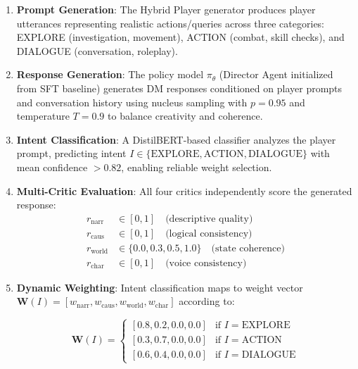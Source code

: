 \documentclass[11pt]{article}
\begin{document}
\begin{enumerate}
    \item \textbf{Prompt Generation}: The Hybrid Player generator produces player utterances representing realistic actions/queries across three categories: EXPLORE (investigation, movement), ACTION (combat, skill checks), and DIALOGUE (conversation, roleplay).
    
    \item \textbf{Response Generation}: The policy model $\pi_\theta$ (Director Agent initialized from SFT baseline) generates DM responses conditioned on player prompts and conversation history using nucleus sampling with $p=0.95$ and temperature $T=0.9$ to balance creativity and coherence.
    
    \item \textbf{Intent Classification}: A DistilBERT-based classifier analyzes the player prompt, predicting intent $I \in \{\text{EXPLORE}, \text{ACTION}, \text{DIALOGUE}\}$ with mean confidence $>0.82$, enabling reliable weight selection.
    
    \item \textbf{Multi-Critic Evaluation}: All four critics independently score the generated response:
    \begin{align}
        r_{\text{narr}} &\in [0,1] \quad \text{(descriptive quality)} \\
        r_{\text{caus}} &\in [0,1] \quad \text{(logical consistency)} \\
        r_{\text{world}} &\in \{0.0, 0.3, 0.5, 1.0\} \quad \text{(state coherence)} \\
        r_{\text{char}} &\in [0,1] \quad \text{(voice consistency)}
    \end{align}
    
    \item \textbf{Dynamic Weighting}: Intent classification maps to weight vector $\mathbf{W}(I) = [w_{\text{narr}}, w_{\text{caus}}, w_{\text{world}}, w_{\text{char}}]$ according to:
    
    \begin{equation}
    \mathbf{W}(I) = \begin{cases}
        [0.8, 0.2, 0.0, 0.0] & \text{if } I = \text{EXPLORE} \\
        [0.3, 0.7, 0.0, 0.0] & \text{if } I = \text{ACTION} \\
        [0.6, 0.4, 0.0, 0.0] & \text{if } I = \text{DIALOGUE}
    \end{cases}
    \end{equation}
    

\end{enumerate}
\end{document}

